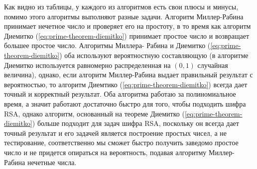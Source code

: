   Как видно из таблицы, у каждого из алгоритмов есть свои плюсы и минусы, помимо этого алгоритмы выполняют разные задачи. Алгоритм Миллер-Рабина принимает нечетное число 
и проверяет его на простоту, в то время как алгоритм Диемитко (\ref{eq:prime-theorem-diemitko}) принимает простое число и возвращает большее простое число. Алгоритмы Миллера-
Рабина и Диемитко (\ref{eq:prime-theorem-diemitko}) оба используют вероятностную составляющую (в алгоритме Диемитко используется равномерно распределенная на 
$(0,1)$ случайная величина), однако, если алгоритм Миллер-Рабина выдает правильный результат с вероятностью, то алгоритм Диемтико (\ref{eq:prime-theorem-diemitko}) всегда дает точный и корректный результат. Оба алгоритма работаю за полиномиальное время, а значит работают достаточно быстро для того, чтобы подходить шифра RSA, однако алгоритм, основанный на теореме Диемитко (\ref{eq:prime-theorem-diemitko}) больше подходит для задач шифра RSA, поскольку он всегда дает точный результат и его задачей является построение простых чисел, а не тестирование, соответственно мы сможет быстро получить заведомо простое число и не придется опираться на вероятность, подавая алгоритму Миллер-Рабина нечетные числа.






